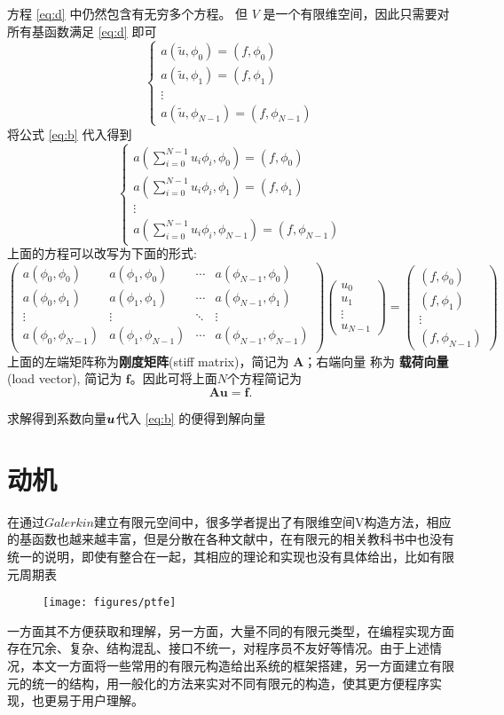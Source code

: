 方程 \eqref{eq:d} 中仍然包含有无穷多个方程。 但 $V$ 是一个有限维空间，因此只需要对所有基函数满足 \eqref{eq:d} 即可
$$
\begin{cases}
	a(\tilde u, \phi_0) = (f, \phi_0) \\
	a(\tilde u, \phi_1) = (f, \phi_1) \\
	\vdots \\
	a(\tilde u, \phi_{N-1}) = (f, \phi_{N-1})
\end{cases}
$$
将公式 \eqref{eq:b} 代入得到
$$
\begin{cases}
	a(\sum_{i=0}^{N-1}u_i \phi_i, \phi_0) = (f, \phi_0) \\
	a(\sum_{i=0}^{N-1}u_i \phi_i, \phi_1) = (f, \phi_1) \\
	\vdots \\
	a(\sum_{i=0}^{N-1}u_i \phi_i, \phi_{N-1}) = (f, \phi_{N-1})
\end{cases}
$$
上面的方程可以改写为下面的形式:
$$
\begin{pmatrix}
	a(\phi_0, \phi_0) & a(\phi_1, \phi_0) & \cdots & a(\phi_{N-1}, \phi_0) \\
	a(\phi_0, \phi_1) & a(\phi_1, \phi_1) & \cdots & a(\phi_{N-1}, \phi_1) \\
	\vdots & \vdots & \ddots & \vdots \\
	a(\phi_0, \phi_{N-1}) & a(\phi_1, \phi_{N-1}) & \cdots & a(\phi_{N-1},
	\phi_{N-1}) \\
\end{pmatrix}
\begin{pmatrix}
	u_0 \\ u_1 \\ \vdots \\ u_{N-1}
\end{pmatrix}
=
\begin{pmatrix}
	(f, \phi_0) \\ (f, \phi_1) \\ \vdots \\ (f, \phi_{N-1})
\end{pmatrix}
$$
上面的左端矩阵称为{\bf 刚度矩阵}(stiff matrix)，简记为 $\mathbf A$；右端向量
称为 {\bf 载荷向量} (load vector), 简记为 $\mathbf f$。因此可将上面$N$个方程简记为
$$
\mathbf A\mathbf u = \mathbf f.
$$

求解得到系数向量${\boldsymbol u}$代入 \eqref{eq:b} 的便得到解向量

\section{动机}
在通过$Galerkin$建立有限元空间中，很多学者提出了有限维空间V构造方法，相应的基函数也越来越丰富，但是分散在各种文献中，在有限元的相关教科书中也没有统一的说明，即使有整合在一起，其相应的理论和实现也没有具体给出，比如有限元周期表
\begin{figure}[H]
	\centering
	\texttt{[image: figures/ptfe]}
	\caption{}
	\label{fig:ptfe}
\end{figure}
一方面其不方便获取和理解，另一方面，大量不同的有限元类型，在编程实现方面存在冗余、复杂、结构混乱、接口不统一，对程序员不友好等情况。由于上述情况，本文一方面将一些常用的有限元构造给出系统的框架搭建，另一方面建立有限元的统一的结构，用一般化的方法来实对不同有限元的构造，使其更方便程序实现，也更易于用户理解。
